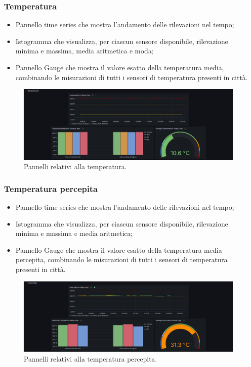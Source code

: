 \documentclass[8pt]{article}
\begin{document}
\subsubsection{Temperatura}
\begin{itemize}
\setlength\itemsep{0em}
    \item Pannello time series che mostra l'andamento delle rilevazioni nel tempo;
    \item Istogramma che visualizza, per ciascun sensore disponibile, rilevazione minima e massima, media aritmetica e moda;
    \item Pannello Gauge che mostra il valore esatto della temperatura media, combinando le misurazioni di tutti i sensori di temperatura presenti in città.
\end{itemize}
\begin{figure}[H]
    \centering
    \includegraphics[width=15cm]{images_mu/temperature.png}
    \caption{Pannelli relativi alla temperatura.}
    \label{fig:Pannelli relativi alla temperatura}
\end{figure}
\subsubsection{Temperatura percepita}
\begin{itemize}
\setlength\itemsep{0em}
    \item Pannello time series che mostra l'andamento delle rilevazioni nel tempo;
    \item Istogramma che visualizza, per ciascun sensore disponibile, rilevazione minima e massima e media aritmetica;
    \item Pannello Gauge che mostra il valore esatto della temperatura media percepita, combinando le misurazioni di tutti i sensori di temperatura presenti in città.
\end{itemize}
\begin{figure}[H]
    \centering
    \includegraphics[width=15cm]{images_mu/heat_index.png}
    \caption{Pannelli relativi alla temperatura percepita.}
    \label{fig:Pannelli relativi alla temperatura percepita}
\end{figure}
\end{document}

